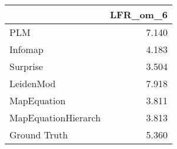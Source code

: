 \begin{tabular}{lr}
\toprule
{} & LFR_om_6 \\
\midrule
PLM                 &    7.140 \\
Infomap             &    4.183 \\
Surprise            &    3.504 \\
LeidenMod           &    7.918 \\
MapEquation         &    3.811 \\
MapEquationHierarch &    3.813 \\
Ground Truth        &    5.360 \\
\bottomrule
\end{tabular}
